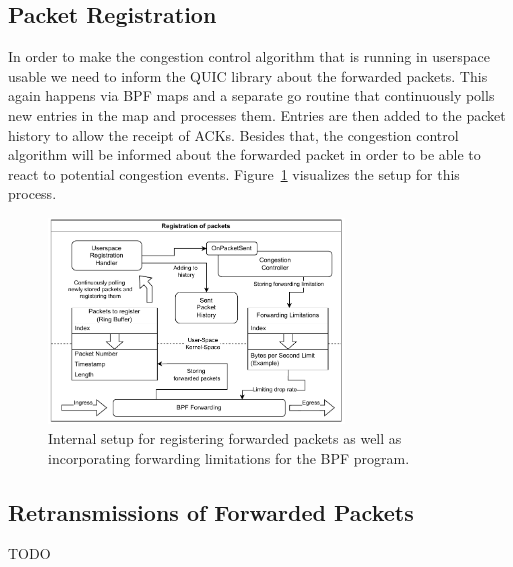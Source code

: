 \subsection{Packet Registration}
In order to make the congestion control algorithm that is running in userspace
usable we need to inform the QUIC library about the forwarded packets.
This again happens via BPF maps and a separate go routine that continuously
polls new entries in the map and processes them.
Entries are then added to the packet history to allow the receipt of ACKs.
Besides that, the congestion control algorithm will be informed about the
forwarded packet in order to be able to react to potential congestion events.
Figure~\ref{fig:forward-registration} visualizes the setup for this process.
\begin{figure}[H]
    \centering
    \includegraphics[width=0.7\textwidth]{figures/03_fast_relays/forward-registration.drawio.pdf}
    \caption[Packet registration schematic]{Internal setup for registering forwarded packets as well as incorporating forwarding
    limitations for the BPF program.}\label{fig:forward-registration}
\end{figure}

\subsection{Retransmissions of Forwarded Packets}
TODO